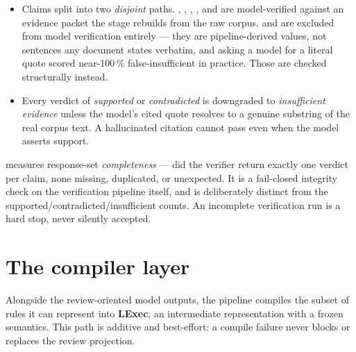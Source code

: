 \documentclass[11pt]{article}
\begin{document}
\begin{itemize}
  \item Claims split into two \emph{disjoint} paths.
    , , , ,
     and  are model-verified against an
    evidence packet the stage rebuilds from the raw corpus.
     and  are excluded from model
    verification entirely --- they are pipeline-derived values, not
    sentences any document states verbatim, and asking a model for a
    literal quote scored near-100\,\% false-insufficient in practice. Those
    are checked structurally instead.
  \item Every verdict of \emph{supported} or \emph{contradicted} is
    downgraded to \emph{insufficient evidence} unless the model's cited
    quote resolves to a genuine substring of the real corpus text. A
    hallucinated citation cannot pass even when the model asserts support.
\end{itemize}

\begin{keypoint}[title={Coverage is not the same as outcome}]
 measures response-set \emph{completeness}
--- did the verifier return exactly one verdict per claim, none missing,
duplicated, or unexpected. It is a fail-closed integrity check on the
verification pipeline itself, and is deliberately distinct from the
supported/contradicted/insufficient counts. An incomplete verification run
is a hard stop, never silently accepted.
\end{keypoint}

\section{The compiler layer}

Alongside the review-oriented model outputs, the pipeline compiles the
subset of rules it can represent into \textbf{LExec}, an intermediate
representation with a frozen semantics. This path is additive and
best-effort: a compile failure never blocks or replaces the review
projection.
\end{document}
